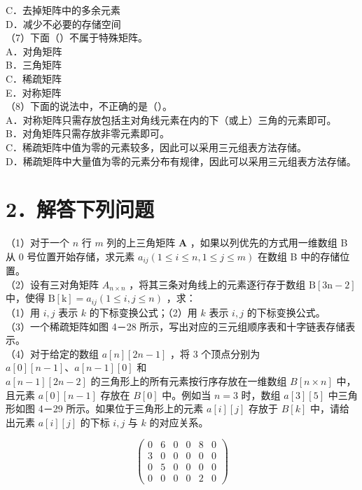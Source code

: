 \documentclass[10pt]{article}
\begin{document}
C．去掉矩阵中的多余元素\\
D．减少不必要的存储空间\\
（7）下面（）不属于特殊矩阵。\\
A．对角矩阵\\
B．三角矩阵\\
C．稀疏矩阵\\
E．对称矩阵\\
（8）下面的说法中，不正确的是（）。\\
A．对称矩阵只需存放包括主对角线元素在内的下（或上）三角的元素即可。\\
B．对角矩阵只需存放非零元素即可。\\
C．稀疏矩阵中值为零的元素较多，因此可以采用三元组表方法存储。\\
D．稀疏矩阵中大量值为零的元素分布有规律，因此可以采用三元组表方法存储。

\section*{2．解答下列问题}
（1）对于一个 $n$ 行 $m$ 列的上三角矩阵 $\boldsymbol{A}$ ，如果以列优先的方式用一维数组 B 从 0 号位置开始存储，求元素 $a_{i j}(1 \leqslant i \leqslant n, 1 \leqslant j \leqslant m)$ 在数组 B 中的存储位置。\\
（2）设有三对角矩阵 $A_{n \times n}$ ，将其三条对角线上的元素逐行存于数组 $\mathrm{B}[3 \mathrm{n}-2]$ 中，使得 $\mathrm{B}[\mathrm{k}]=a_{i j}(1 \leqslant i, j \leqslant n)$ ，求：\\
（1）用 $i, j$ 表示 $k$ 的下标变换公式；（2）用 $k$ 表示 $i, j$ 的下标变换公式。\\
（3）一个稀疏矩阵如图 4－28 所示，写出对应的三元组顺序表和十字链表存储表示。\\
（4）对于给定的数组 $a[n][2 n-1]$ ，将 3 个顶点分别为 $a[0][n-1] 、 a[n-1][0]$ 和\\
$a[n-1][2 n-2]$ 的三角形上的所有元素按行序存放在一维数组 $B[n \times n]$ 中，且元素 $a[0][n-1]$ 存放在 $B[0]$ 中。例如当 $n=3$ 时，数组 $a[3][5]$ 中三角形如图 4－29 所示。如果位于三角形上的元素 $a[i][j]$ 存放于 $B[k]$ 中，请给出元素 $a[i][j]$ 的下标 $i, j$ 与 $k$ 的对应关系。

$$
\left(\begin{array}{llllll}
0 & 6 & 0 & 0 & 8 & 0 \\
3 & 0 & 0 & 0 & 0 & 0 \\
0 & 5 & 0 & 0 & 0 & 0 \\
0 & 0 & 0 & 0 & 2 & 0
\end{array}\right)
$$
\end{document}
